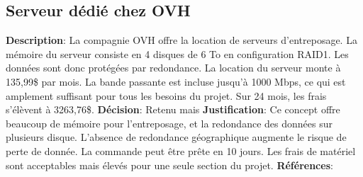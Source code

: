 

\subsection{Serveur dédié chez OVH}
\label{s:archiver_conc4}

\textbf{Description}: La compagnie OVH offre la location de serveurs d’entreposage. La mémoire du serveur consiste en 4 disques de 6 To en configuration RAID1. Les données sont donc protégées par redondance. La location du serveur monte à 135,99\$ par mois. La bande passante est incluse jusqu’à 1000 Mbps, ce qui est amplement suffisant pour tous les besoins du projet. Sur 24 mois, les frais s’élèvent à 3263,76\$. 
\textbf{Décision}: Retenu mais
\textbf{Justification}: Ce concept offre beaucoup de mémoire pour l’entreposage, et la redondance des données sur plusieurs disque. L’absence de redondance géographique augmente le risque de perte de donnée. La commande peut être prête en 10 jours. Les frais de matériel sont acceptables mais élevés pour une seule section du projet.
\textbf{Références}: 
\cite{siteOVH}

